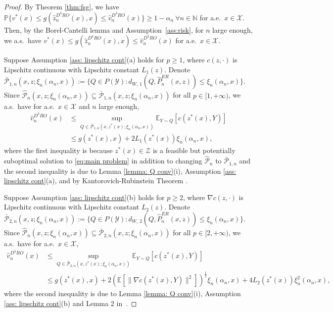 \documentclass[onefignum,onetabnum]{siamart251216}
\begin{document}
\begin{proof}
    By Theorem \ref{thm:fsg}, we have  
    $\mathbb{P}\bigl\{v^*(x) \leq g(\hat{z}_n^{D^3RO}(x),x) \leq \hat{v}_n^{D^3RO}(x)\bigr\} \geq 1- \alpha_n\ \forall n\in\mathbb{N}$ for a.e.\ $x \in \mathcal{X}$. 
    Then, by the  Borel-Cantelli lemma and Assumption~\ref{ass:risk},
    for $n$ large enough, we a.s.\ have $v^*(x) \leq g(\hat{z}_n^{D^3RO}(x),x) \leq \hat{v}_n^{D^3RO}(x)$ for a.e.\ $x \in \mathcal{X}$. 

    
    Suppose Assumption \ref{ass: lipschitz cont}(a) holds for $p \geq 1$, where $c(z,\cdot)$ is Lipschitz continuous with Lipschitz constant $L_1(z)$. Denote $\bar{\mathcal{P}}_{1,n}(x,z; \xi_n(\alpha_n,x))
    \allowbreak :=\{Q \in P(\mathcal{Y}): d_{W,\, 1} (Q,\hat{P}_n^{ER}(x,z))\leq \xi_n(\alpha_n,x)\}$. Since $\hat{\mathcal{P}}_n(x,z; \xi_n(\alpha_n,x)) \subseteq \bar{\mathcal{P}}_{1,n}(x,z; \xi_n(\alpha_n,x))$ for all  $p \in [1,+\infty)$, we a.s.\ have for a.e.\ $x \in \mathcal{X}$ and $n$ large enough, 
    \begin{align*}
        \hat{v}_n^{D^3RO}(x) &\leq \sup_{ Q \in \bar{\mathcal{P}}_{1,n}(x,z^*(x); \xi_n(\alpha_n,x))} \mathbb{E}_{Y \sim Q} [c(z^*(x),Y)] \\
        &\leq g(z^*(x),x) + 2L_1(z^*(x)) \xi_n(\alpha_n,x),
    \end{align*}
    where the first inequality is because $z^*(x)\in\mathcal{Z}$ is a feasible but potentially suboptimal solution to \eqref{eq:main problem} in addition to changing $\hat{\mathcal{P}}_n$ to $\bar{\mathcal{P}}_{1,n}$ and the second inequality is due to Lemma \ref{lemma: Q conv}(i), Assumption \ref{ass: lipschitz cont}(a), and by Kantorovich-Rubinstein Theorem \citep[e.g.,][Theorem 2]{kuhn2019wasserstein}.

    Suppose Assumption \ref{ass: lipschitz cont}(b) holds for $p \geq 2$, where $\nabla c(z,\cdot)$ is Lipschitz continuous with Lipschitz constant $L_2(z)$. Denote $\bar{\mathcal{P}}_{2,n}(x,z; \xi_n(\alpha_n,x)):=\{Q \in P(\mathcal{Y}): d_{W,\, 2} (Q,\hat{P}_n^{ER}(x,z))\leq \xi_n(\alpha_n,x)\}$. Since  $\hat{\mathcal{P}}_n(x,z; \xi_n(\alpha_n,x)) \subseteq \bar{\mathcal{P}}_{2,n}(x,z; \xi_n(\alpha_n,x))$ for all $p\in [2,+\infty)$, we a.s.\ have for a.e.\ $x \in \mathcal{X}$, 
    \small
    \begin{align*}
        \hat{v}_n^{D^3RO}(x) & \leq \sup_{ Q \in \bar{\mathcal{P}}_{2,n}(x,z^*(x); \xi_n(\alpha_n,x))} \mathbb{E}_{Y \sim Q} [c(z^*(x),Y)]\\
        & \leq g(z^*(x),x) + 2\left(\mathbb{E}[\|\nabla c(z^*(x),Y)\|^2]\right)^{\frac{1}{2}} \xi_n(\alpha_n,x) + 4L_2(z^*(x))\xi_n^2(\alpha_n,x),
    \end{align*}
    \normalsize
    where the second inequality is due to Lemma \ref{lemma: Q conv}(i), Assumption \ref{ass: lipschitz cont}(b) and Lemma 2 in~\cite{gao2023finite}.
\end{proof}
\end{document}
